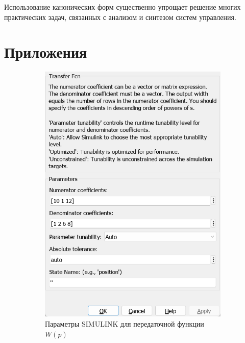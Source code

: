 \documentclass[a4paper, 12pt]{article}
\begin{document}
    
    Использование канонических форм существенно упрощает решение многих практических задач,
    связанных с анализом и синтезом систем управления.


    \section{Приложения}
    \begin{figure}[H]
        \centering
        \begin{subfigure}{0.3\textwidth}
            \centering
            \includegraphics[width=\linewidth]{W_p_1_window.png}
            \caption{Параметры SIMULINK для передаточной функции $W(p)$}
            \label{fig:wp1w}
        \end{subfigure}
        \begin{subfigure}{0.3\textwidth}
            \centering

\end{subfigure}
\end{figure}
\end{document}
